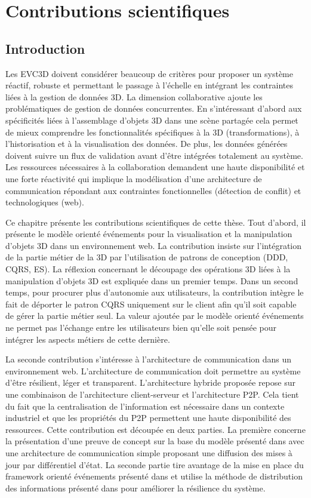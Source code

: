 \chapter{Contributions scientifiques}
\chaptertable
\section{Introduction}
Les \gls{EVC3D} doivent considérer beaucoup de critères pour 
proposer un système réactif, robuste et permettant le passage à l'échelle en 
intégrant les contraintes liées à la gestion de données 3D. La dimension 
collaborative ajoute les problématiques de gestion de données concurrentes.
En s'intéressant d'abord aux spécificités liées à 
l'assemblage d'objets 3D dans une scène partagée cela permet de 
mieux comprendre les fonctionnalités spécifiques à la 3D (transformations), 
à l'historisation et à la visualisation des données. De plus, les données générées
doivent suivre un flux de validation avant d'être intégrées totalement au système.
Les ressources nécessaires à la collaboration demandent une haute disponibilité 
et une forte réactivité qui implique la modélisation d'une architecture 
de communication répondant aux contraintes fonctionnelles (détection de conflit) 
et technologiques (web).

Ce chapitre présente les contributions scientifiques de cette thèse.
Tout d'abord, il présente le modèle orienté événements pour la 
visualisation et la manipulation d'objets 3D dans un environnement web. La 
contribution insiste sur l'intégration de la partie métier de la 3D par l'utilisation de
patrons de conception (\gls{DDD}, \gls{CQRS}, \gls{ES}). La réflexion concernant 
le découpage des opérations 3D liées à la manipulation d'objets 3D est expliquée 
dans un premier temps. Dans un second temps, pour procurer plus d'autonomie 
aux utilisateurs, la contribution intègre le fait de déporter le patron \gls{CQRS} 
uniquement sur le client afin qu'il soit capable de gérer la partie métier seul. 
La valeur ajoutée par le modèle orienté événements ne permet pas l'échange entre les
utilisateurs bien qu'elle soit pensée pour intégrer les aspects métiers de cette
dernière. 

La seconde contribution s'intéresse à l'architecture de 
communication dans un environnement web. L'architecture de communication doit 
permettre au système d'être résilient, léger et transparent. 
L'architecture hybride proposée repose sur une combinaison de l'architecture 
client-serveur et l'architecture \gls{P2P}. 
Cela tient du fait que la centralisation de l'information est nécessaire dans un 
contexte industriel et que les propriétés du \gls{P2P} permettent une haute disponibilité 
des ressources. Cette contribution est découpée en deux parties. La première 
concerne la présentation d'une preuve de concept sur la base du modèle présenté 
dans \cite{Desprat2015a} avec une architecture de communication simple 
proposant une diffusion des mises à jour par différentiel d'état. La seconde partie 
tire avantage de la mise en place du \gls{framework} orienté événements présenté 
dans 
\cite{Desprat2016} et utilise la méthode de distribution des informations présenté 
dans \cite{Desprat2017} pour améliorer la résilience du système. 

